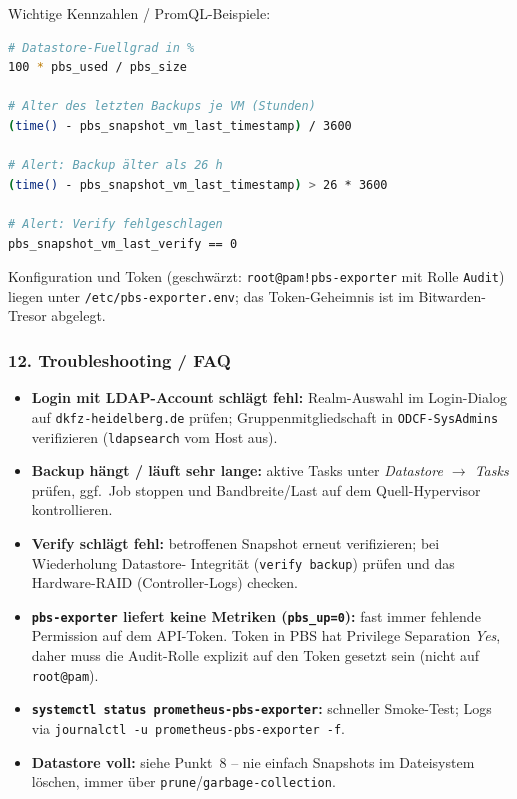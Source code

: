Wichtige Kennzahlen / PromQL-Beispiele:
\begin{lstlisting}[language=bash,caption={Nuetzliche PromQL-Queries}]
# Datastore-Fuellgrad in %
100 * pbs_used / pbs_size

# Alter des letzten Backups je VM (Stunden)
(time() - pbs_snapshot_vm_last_timestamp) / 3600

# Alert: Backup älter als 26 h
(time() - pbs_snapshot_vm_last_timestamp) > 26 * 3600

# Alert: Verify fehlgeschlagen
pbs_snapshot_vm_last_verify == 0
\end{lstlisting}
Konfiguration und Token (geschwärzt: \texttt{root@pam!pbs-exporter}
mit Rolle \texttt{Audit}) liegen unter
\texttt{/etc/pbs-exporter.env}; das Token-Geheimnis ist im
Bitwarden-Tresor abgelegt.

\subsubsection*{12. Troubleshooting / FAQ}
\begin{itemize}\setlength{\itemsep}{1pt}
    \item \textbf{Login mit LDAP-Account schlägt fehl:}
          Realm-Auswahl im Login-Dialog auf \texttt{dkfz-heidelberg.de}
          prüfen; Gruppenmitgliedschaft in
          \texttt{ODCF-SysAdmins} verifizieren
          (\texttt{ldapsearch} vom Host aus).
    \item \textbf{Backup hängt / läuft sehr lange:} aktive Tasks
          unter \emph{Datastore $\to$ Tasks} prüfen,
          ggf.\ Job stoppen und Bandbreite/Last auf dem
          Quell-Hypervisor kontrollieren.
    \item \textbf{Verify schlägt fehl:} betroffenen Snapshot
          erneut verifizieren; bei Wiederholung Datastore-
          Integrität (\texttt{verify backup}) prüfen und das
          Hardware-\ac{RAID} (Controller-Logs) checken.
    \item \textbf{\texttt{pbs-exporter} liefert keine Metriken
          (\texttt{pbs\_up=0}):} fast immer fehlende Permission
          auf dem API-Token. Token in PBS hat Privilege Separation
          \emph{Yes}, daher muss die Audit-Rolle explizit auf den
          Token gesetzt sein (nicht auf \texttt{root@pam}).
    \item \textbf{\texttt{systemctl status prometheus-pbs-exporter}:}
          schneller Smoke-Test; Logs via
          \texttt{journalctl -u prometheus-pbs-exporter -f}.
    \item \textbf{Datastore voll:} siehe Punkt~8 -- nie einfach
          Snapshots im Dateisystem löschen, immer über
          \texttt{prune}/\texttt{garbage-collection}.
\end{itemize}


